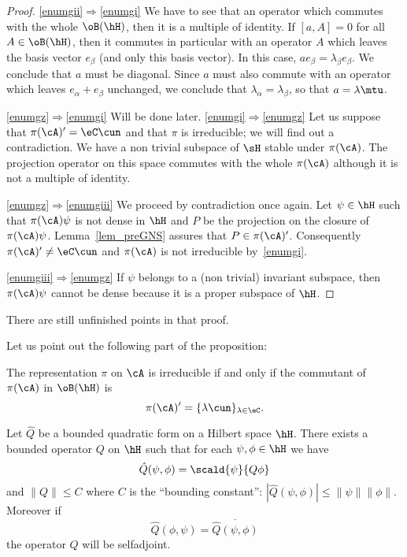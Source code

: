 \begin{proof}
	\ref{enumgii}$\Rightarrow$\ref{enumgi}
	We have to see that an operator which commutes with the whole $\oB(\hH)$, then it is a multiple of identity. If $[a,A]=0$ for all $A\in\oB(\hH)$, then it commutes in particular with an operator $A$ which leaves the basis vector $e_{\beta}$ (and only this basis vector). In this case, $ae_{\beta}=\lambda_{\beta}e_{\beta}$. We conclude that $a$ must be diagonal. Since $a$ must also commute with an operator which leaves $e_{\alpha}+e_{\beta}$ unchanged, we conclude that $\lambda_{\alpha}=\lambda_{\beta}$, so that $a=\lambda\mtu$.

	\ref{enumgz}$\Rightarrow$\ref{enumgi} Will be done later.
	\ref{enumgi}$\Rightarrow$\ref{enumgz} Let us suppose that $\pi(\cA)'=\eC\cun$ and that $\pi$ is irreducible; we will find out a contradiction. We have a non trivial subspace of $\sH$ stable under $\pi(\cA)$. The projection operator on this space commutes with the whole $\pi(\cA)$ although it is not a multiple of identity.

	\ref{enumgz}$\Rightarrow$\ref{enumgiii} We proceed by contradiction once again.  Let $\psi\in\hH$ such that $\pi(\cA)\psi$ is not dense in $\hH$ and $P$ be the projection on the closure of $\pi(\cA)\psi$. Lemma~\ref{lem_preGNS} assures that $P\in\pi(\cA)'$. Consequently $\pi(\cA)'\neq \eC\cun$ and $\pi(\cA)$ is not irreducible by~\ref{enumgi}.

	\ref{enumgiii}$\Rightarrow$\ref{enumgz} If $\psi$ belongs to a (non trivial) invariant subspace, then $\pi(\cA)\psi$ cannot be dense because it is a proper subspace of $\hH$.

\end{proof}

\begin{probleme}
	There are still unfinished points in that proof.
\end{probleme}


Let us point out the following part of the proposition:

\begin{lemma}
	The representation $\pi$ on $\cA$ is irreducible if and only if the commutant of $\pi(\cA)$ in $\oB(\hH)$ is
	\[
		\pi(\cA)'=\{ \lambda\cun \}_{\lambda\in\eC}.
	\]

\end{lemma}


\begin{lemma}
	Let $\hat Q$ be a bounded quadratic form on a Hilbert space $\hH$. There exists a bounded operator $Q$ on $\hH$ such that for each $\psi,\phi\in\hH$ we have
	\[
		\hat Q(\psi,\phi)=\scald{ \psi}{Q\phi }
	\]
	and $\| Q \|\leq C$ where $C$ is the ``bounding constant'': $| \hat Q(\psi,\phi) |\leq \| \psi \|\| \phi \|$.
	Moreover if
	\begin{equation}  \label{eq_r19032}
		\hat Q(\phi,\psi)=\overline{ \hat Q(\psi,\phi) }
	\end{equation}
	the operator $Q$ will be selfadjoint.
	\label{lem_r19031}
\end{lemma}

